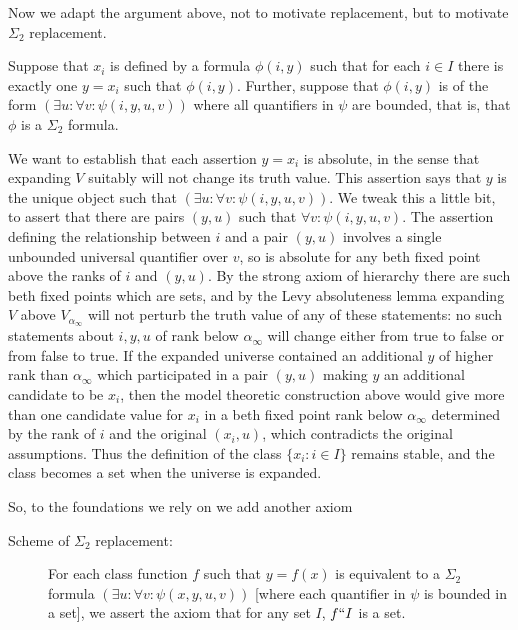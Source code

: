 \documentclass[12pt]{article}
\begin{document}
Now we adapt the argument above, not to motivate replacement, but to motivate $\Sigma_2$ replacement.  

Suppose that $x_i$ is defined by a formula $\phi(i,y)$ such that for each $i \in I$ there is exactly one $y=x_i$ such that $\phi(i,y)$.  Further, suppose
that $\phi(i,y)$ is of the form $(\exists u:\forall v:\psi(i,y,u,v))$ where all quantifiers in $\psi$ are bounded, that is, that $\phi$ is a $\Sigma_2$ formula.

We want to establish that each assertion $y=x_i$ is absolute, in the sense that expanding $V$ suitably will not change its truth value.  This assertion 
says that $y$ is the unique object such that $(\exists u:\forall v:\psi(i,y,u,v))$.  We tweak this a little bit, to assert that there are pairs $(y,u)$ such that $\forall v:\psi(i,y,u,v)$.
The assertion defining the relationship between $i$ and a pair $(y,u)$ involves a single unbounded universal quantifier over $v$, so is absolute for any beth fixed point above the ranks of $i$ and $(y,u)$.   By the strong axiom of hierarchy there are such beth fixed points which are sets, and by the Levy absoluteness lemma expanding $V$ above $V_{\alpha_{\infty}}$ will not perturb the truth value of any of these statements:  no such statements about $i,y,u$ of rank below $\alpha_{\infty}$ will change either from true to false or from false to true.   If the expanded universe contained an additional $y$ of higher rank
than $\alpha_{\infty}$ which participated in a pair $(y,u)$ making $y$ an additional candidate to be $x_i$, then the model theoretic construction above would give more than one candidate value for $x_i$ in a beth fixed point rank below $\alpha_{\infty}$ determined by the rank of $i$ and the original $(x_i,u)$, which contradicts the original assumptions.  Thus the definition of the class $\{x_i:i \in I\}$ remains stable, and the class becomes a set when the universe is expanded.  

So, to the foundations we rely on we add another axiom

\begin{description}

\item[Scheme of $\Sigma_2$ replacement:] For each class function $f$ such that $y=f(x)$ is equivalent to a $\Sigma_2$ formula $(\exists u:\forall v:\psi(x,y,u,v))$ [where each quantifier in $\psi$ is bounded in a set], we assert the axiom that for any set $I$, $f``I$ is a set.
\end{description}
\end{document}
